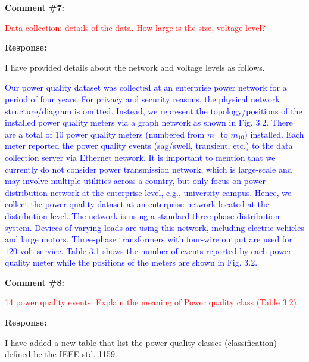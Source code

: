 \documentclass[journal]{IEEEtran}
\begin{document}
\vspace{30pt}
\textbf{Comment \#7:}
\begin{adjustwidth}{2.5em}{0pt}
\singlespacing \vspace{-10pt}
\textcolor{red}{Data collection: details of the data. How large is the size, voltage level?}
\end{adjustwidth}

\vspace{10pt}
\textbf{Response:}
\begin{adjustwidth}{2.5em}{0pt}
I have provided details about the network and voltage levels as follows.

\vspace{10pt}
\noindent\textcolor{blue}{Our power quality dataset was collected at an enterprise power network for a period of four years. For privacy and security reasons, the physical network structure/diagram is omitted. Instead, we represent the topology/positions of the installed power quality meters via a graph network as shown in Fig. 3.2. There are a total of $10$ power quality meters (numbered from $m_1$ to $m_{10}$) installed. Each meter reported the power quality events (sag/swell, transient, etc.) to the data collection server via Ethernet network. It is important to mention that we currently do not consider power transmission network, which is large-scale and may involve multiple utilities across a country, but only focus on power distribution network at the enterprise-level, e.g., university campus. Hence, we collect the power quality dataset at an enterprise network located at the distribution level. The network is using a standard three-phase distribution system. Devices of varying loads are using this network, including electric vehicles and large motors. Three-phase transformers with four-wire output are used for $120$ volt service. Table 3.1 shows the number of events reported by each power quality meter while the positions of the meters are shown in Fig. 3.2.}
\end{adjustwidth}


\vspace{30pt}
\textbf{Comment \#8:}
\begin{adjustwidth}{2.5em}{0pt}
\singlespacing \vspace{-10pt}
\textcolor{red}{14 power quality events. Explain the meaning of Power quality class (Table 3.2).}
\end{adjustwidth}

\vspace{10pt}
\textbf{Response:}
\begin{adjustwidth}{2.5em}{0pt}
I have added a new table that list the power quality classes (classification) defined be the IEEE std. 1159.
\end{adjustwidth}
\end{document}
